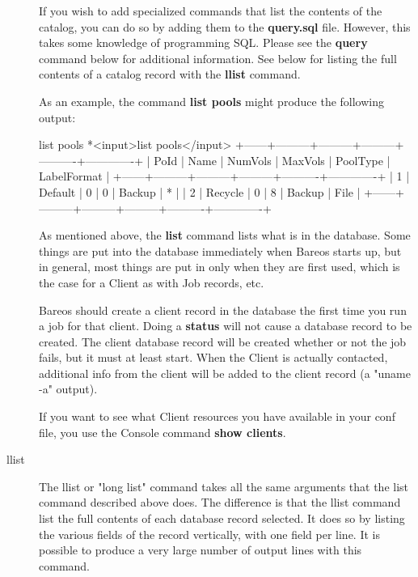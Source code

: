 \begin{description}
   If you wish to add specialized commands that list the contents of the
   catalog, you can do so by adding them to the {\bf query.sql} file.
   However, this takes some knowledge of programming SQL. Please see the
   {\bf query} command below for additional information.  See below for
   listing the full contents of a catalog record with the {\bf llist}
   command.

   As an example, the command {\bf list pools} might produce  the following
   output:

\begin{bconsole}{list pools}
*<input>list pools</input>
+------+---------+---------+---------+----------+-------------+
| PoId | Name    | NumVols | MaxVols | PoolType | LabelFormat |
+------+---------+---------+---------+----------+-------------+
|    1 | Default |       0 |       0 | Backup   | *           |
|    2 | Recycle |       0 |       8 | Backup   | File        |
+------+---------+---------+---------+----------+-------------+
\end{bconsole}

   As mentioned above, the {\bf list} command lists what is in the
   database.  Some things are put into the database immediately when Bareos
   starts up, but in general, most things are put in only when they are
   first used, which is the case for a Client as with Job records, etc.

   Bareos should create a client record in the database the first time you
   run a job for that client.  Doing a {\bf status} will not cause a
   database record to be created.  The client database record will be
   created whether or not the job fails, but it must at least start.  When
   the Client is actually contacted, additional info from the client will
   be added to the client record (a "uname -a" output).

   If you want to see what Client resources you have available in your conf
   file, you use the Console command {\bf show clients}.

\item [llist]
   The llist or "long list" command takes all the same arguments that the
   list command described above does.  The difference is that the llist
   command list the full contents of each database record selected.  It
   does so by listing the various fields of the record vertically, with one
   field per line.  It is possible to produce a very large number of output
   lines with this command.


\end{description}
